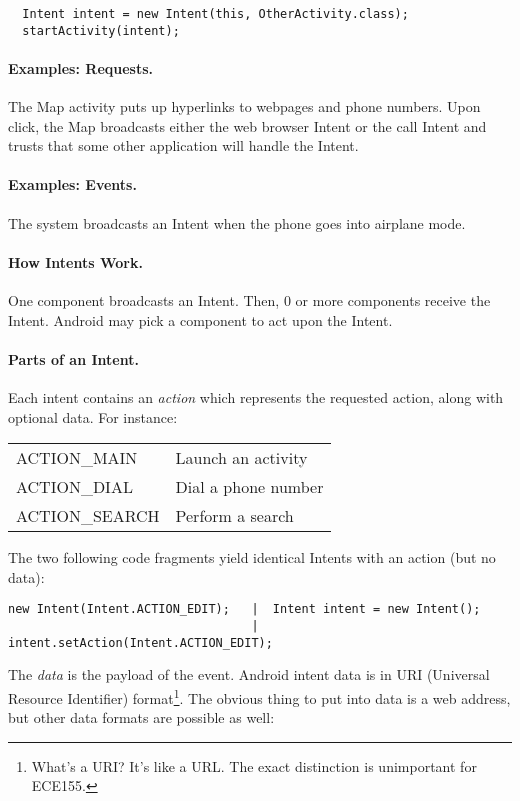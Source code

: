 {\small 
\begin{lstlisting}
  Intent intent = new Intent(this, OtherActivity.class);
  startActivity(intent);
\end{lstlisting}
}

\paragraph{Examples: Requests.} The Map activity puts up hyperlinks to webpages 
and phone numbers. Upon click, the Map broadcasts either the web browser
Intent or the call Intent and trusts that some other application will
handle the Intent.

\paragraph{Examples: Events.} The system broadcasts an Intent when the phone
goes into airplane mode.

\paragraph{How Intents Work.} One component broadcasts an Intent. Then, 
0 or more components receive the Intent. Android may pick a component
to act upon the Intent.

\paragraph{Parts of an Intent.} Each intent contains an \emph{action} which represents the requested
action, along with optional data. For instance:

\hspace*{2em} \begin{tabular}{ll}
ACTION\_MAIN & Launch an activity \\
ACTION\_DIAL & Dial a phone number \\
ACTION\_SEARCH & Perform a search
\end{tabular}

The two following code fragments yield identical Intents with an action (but no data):
{\small
\begin{lstlisting}
new Intent(Intent.ACTION_EDIT);   |  Intent intent = new Intent();
                                  |  intent.setAction(Intent.ACTION_EDIT);
\end{lstlisting}
}

The \emph{data} is the payload of the event. Android intent data is in
URI (Universal Resource Identifier) format\footnote{What's a URI? It's
  like a URL. The exact distinction is unimportant for ECE155.}. The
obvious thing to put into data is a web address, but other data formats
are possible as well:

